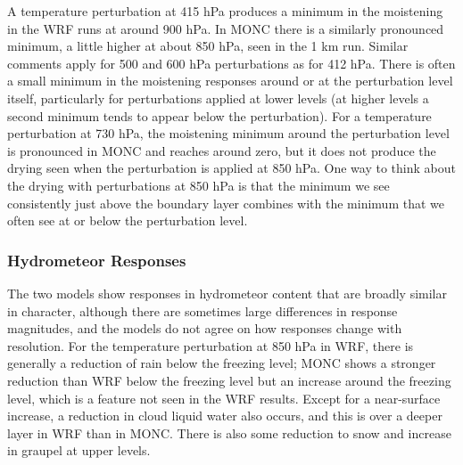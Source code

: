 \documentclass[draft]{agujournal2019}
\begin{document}
A temperature perturbation at 415 hPa produces a minimum in the moistening in
the WRF runs at around 900 hPa. In MONC there is a similarly pronounced minimum,
a little higher at about 850 hPa, seen in the 1 km run. Similar comments apply
for 500 and 600 hPa perturbations as for 412 hPa. There is often a small minimum
in the moistening responses around or at the perturbation level itself,
particularly for perturbations applied at lower levels (at higher levels a
second minimum tends to appear below the perturbation). For a temperature
perturbation at 730 hPa, the moistening minimum around the perturbation level is
pronounced in MONC and reaches around zero, but it does not produce the drying
seen when the perturbation is applied at 850 hPa. One way to think about the
drying with perturbations at 850 hPa is that the minimum we see consistently
just above the boundary layer combines with the minimum that we often see at or
below the perturbation level.

\subsubsection{Hydrometeor Responses}

The two models show responses in hydrometeor content that are broadly similar in
character, although there are sometimes large differences in response
magnitudes, and the models do not agree on how responses change with resolution.
For the temperature perturbation at 850 hPa in WRF, there is generally a
reduction of rain below the freezing level; MONC shows a stronger reduction than
WRF below the freezing level but an increase around the freezing level, which is
a feature not seen in the WRF results. Except for a near-surface increase, a
reduction in cloud liquid water also occurs, and this is over a deeper layer in
WRF than in MONC. There is also some reduction to snow and increase in graupel
at upper levels. 
\end{document}
